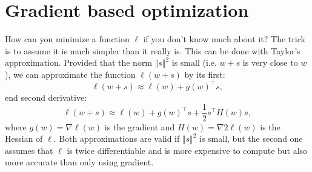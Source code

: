\section{Gradient based optimization}
\label{sec:gradient}
How can you minimize a function $\ell$ if you don't know much about it? 
The trick is to assume it is much simpler than it really is. This can be done with 
Taylor's approximation. Provided that the norm $\Vert s \Vert^{2}$ is small 
(i.e. $w + s$ is very close to $w$), we can approximate the function $\ell (w+s)$ by its 
first: 
\begin{equation}
	\label{equ:first_and_second_derivative}
	\ell(w+s) \approx \ell(w) + g(w)^{\top}s,
\end{equation}
end second derivative:
\begin{equation}
	\label{equ:first_and_second_derivative}
	\ell(w+s) \approx \ell(w) + g(w)^{\top}s + \frac{1}{2}s^{\top}H(w)s,
\end{equation}
where $g(w)=\nabla \ell (w)$ is the gradient and $H(w)=\nabla 2 \ell (w)$ 
is the Hessian of $\ell$.
Both approximations are valid if $\Vert s\Vert^{2}$ is small, but the second one assumes that
$\ell$ is twice differentiable and is more expensive to compute but also more accurate 
than only using gradient. 

